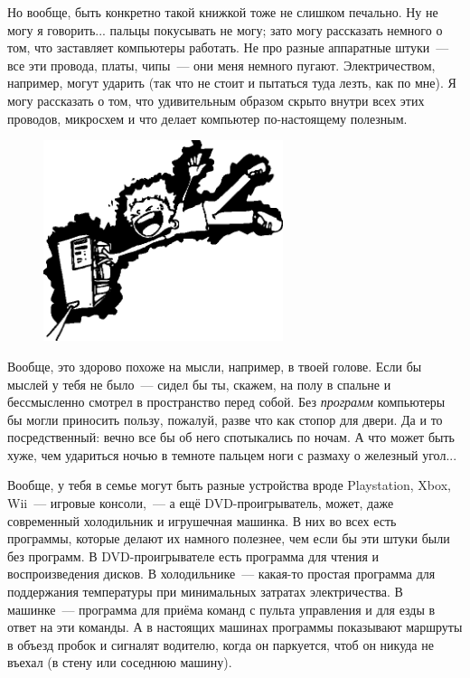 
Но вообще, быть конкретно такой книжкой тоже не слишком печально. Ну не могу я говорить... пальцы покусывать не могу; зато могу рассказать немного о том, что заставляет компьютеры работать. Не про разные аппаратные штуки — все эти провода, платы, чипы — они меня немного пугают. Электричеством, например, могут ударить (так что не стоит и пытаться туда лезть, как по мне). Я могу рассказать о том, что удивительным образом скрыто внутри всех этих проводов, микросхем и что делает компьютер по-настоящему полезным.

\begin{figure}
  \begin{center}
\includegraphics*[width=70mm]{../en/electrocute.eps}
  \end{center}
\end{figure}

Вообще, это здорово похоже на мысли, например, в твоей голове. Если бы мыслей у тебя не было — сидел бы ты, скажем, на полу в спальне и бессмысленно смотрел в пространство перед собой. Без \emph{программ} компьютеры бы могли приносить пользу, пожалуй, разве что как стопор для двери. Да и то посредственный: вечно все бы об него спотыкались по ночам. А что может быть хуже, чем удариться ночью в темноте пальцем ноги с размаху о железный угол...


Вообще, у тебя в семье могут быть разные устройства вроде Playstation, Xbox, Wii — игровые консоли, — а ещё DVD-проигрыватель, может, даже современный холодильник и игрушечная машинка. В них во всех есть программы, которые делают их намного полезнее, чем если бы эти штуки были без программ. В DVD-проигрывателе есть программа для чтения и воспроизведения дисков. В холодильнике — какая-то простая программа для поддержания температуры при минимальных затратах электричества. В машинке — программа для приёма команд с пульта управления и для езды в ответ на эти команды. А в настоящих машинах программы показывают маршруты в объезд пробок и сигналят водителю, когда он паркуется, чтоб он никуда не въехал (в стену или соседнюю машину).

